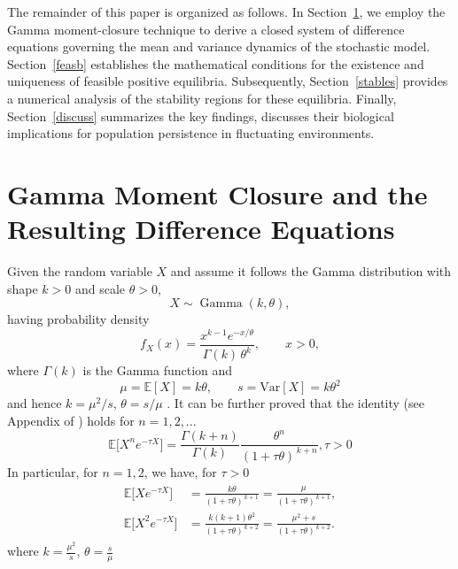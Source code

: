 \documentclass[12pt]{article}
\theoremstyle{definition}
\begin{document}
The remainder of this paper is organized as follows.
In Section~\ref{differnceE}, we employ the Gamma moment-closure technique to derive a closed system of difference equations governing the mean and variance dynamics of the stochastic model.
Section~\ref{feasb} establishes the mathematical conditions for the existence and uniqueness of feasible positive equilibria.
Subsequently, Section~\ref{stables} provides a numerical analysis of the stability regions for these equilibria.
Finally, Section~\ref{discuss} summarizes the key findings, discusses their biological implications for population persistence in fluctuating environments.

\section{Gamma Moment Closure and the Resulting Difference Equations} \label{differnceE}


Given the random variable \(X\) and assume it follows the Gamma distribution with shape \(k>0\) and scale \(\theta>0\),
\[
X \sim \operatorname{Gamma}(k,\theta),
\]
having probability density
\[
f_{X}(x)=\frac{x^{k-1}e^{-x/\theta}}{\Gamma(k)\,\theta^{k}},\qquad x>0,
\]
where $\Gamma(k)$ is the Gamma function and 
\[
\mu=\mathbb{E}[X]= k\theta,\qquad s=\mathrm{Var}[X]=k\theta^2
\]
and hence \(k=\mu^2/s\), \(\theta=s/\mu\) \cite{wikipedia_gamma}. It can be further proved that the identity (see Appendix of \cite{wang2025}) holds for $n=1,2,...$
\begin{equation}\label{ident}
\mathbb{E}\big[X^n e^{-\tau X}\big]=\frac{\Gamma(k+n)}{\Gamma(k)}\frac{\theta^n}{(1+\tau \theta)^{\,k+n}}, \tau>0
\end{equation}
In particular, for $n=1,2$, we have, for $\tau >0$
\begin{align}
\begin{aligned}
\mathbb{E}\big[X e^{- \tau X}\big] &= \frac{k\theta}{(1+ \tau\theta)^{\,k+1}}= \frac{\mu}{(1+ \tau\theta)^{\,k+1}}, \\
\mathbb{E}\big[X^2 e^{- \tau X}\big] &= \frac{k(k+1)\theta^2}{(1+\tau\theta)^{\,k+2}}=\frac{\mu^2+s}{(1+\tau\theta)^{\,k+2}}.
\end{aligned}
\label{r10}
\end{align}
where $ k=\frac{\mu^2}{s}, \, \theta=\frac{s}{\mu}$
\end{document}
